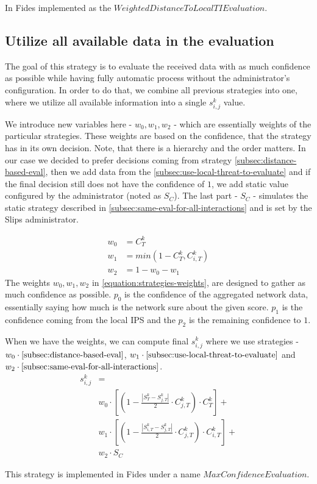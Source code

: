 \noindent
In Fides implemented as the $WeightedDistanceToLocalTIEvaluation$.

\subsection{Utilize all available data in the evaluation}
The goal of this strategy is to evaluate the received data with as much confidence as possible while having fully automatic process without the administrator's configuration.
In order to do that, we combine all previous strategies into one, where we utilize all available information into a single $s^{k}_{i, j}$ value.

We introduce new variables here - $w_{0}, w_{1}, w_{2}$ - which are essentially weights of the particular strategies. These weights are based on the confidence, that the strategy has in its own decision.
Note, that there is a hierarchy and the order matters. 
In our case we decided to prefer decisions coming from strategy \ref{subsec:distance-based-eval}, then we add data from the \ref{subsec:use-local-threat-to-evaluate} and if the final decision still does not have the confidence of $1$, we add static value configured by the administrator (noted as $S_{C}$). 
The last part - $S_{C}$ - simulates the static strategy described in \ref{subsec:same-eval-for-all-interactions} and is set by the Slips administrator.

\begin{equation}
\label{equation:strategies-weights}
\begin{split}
    w_{0} &= {C}^{k}_{T} \\
    w_{1} &= min(1 - {C}^{k}_{T}, {C}^{k}_{i, T}) \\
    w_{2} &= 1 - w_{0} - w_{1}
\end{split}
\end{equation}
The weights $w_{0}, w_{1}, w_{2}$ in \ref{equation:strategies-weights}, are designed to gather as much confidence as possible. $p_{0}$ is the confidence of the aggregated network data, essentially saying how much is the network sure about the given score. 
$p_{1}$ is the confidence coming from the local IPS and the $p_{2}$ is the remaining confidence to $1$.

When we have the weights, we can compute final $s^{k}_{i, j}$ where we use strategies - $w_{0} \cdot \ref{subsec:distance-based-eval}$, $w_{1} \cdot \ref{subsec:use-local-threat-to-evaluate}$ and $w_{2} \cdot \ref{subsec:same-eval-for-all-interactions}$. 
\begin{equation}
\begin{split}
    s^{k}_{i, j} &= \\
    &w_{0} \cdot \left[\left(1 - \frac{|{S}^{k}_{T} - S^{k}_{j, T}|}{2} \cdot C^{k}_{j, T}\right) \cdot C^{k}_{T}\right] + \\
    &w_{1} \cdot \left[\left(1 - \frac{|{S}^{k}_{i, T} - S^{k}_{j, T}|}{2} \cdot C^{k}_{j, T}\right) \cdot C^{k}_{i, T}\right] + \\
    &w_{2} \cdot S_{C}
\end{split}
\end{equation}

\noindent
This strategy is implemented in Fides under a name $MaxConfidenceEvaluation$.